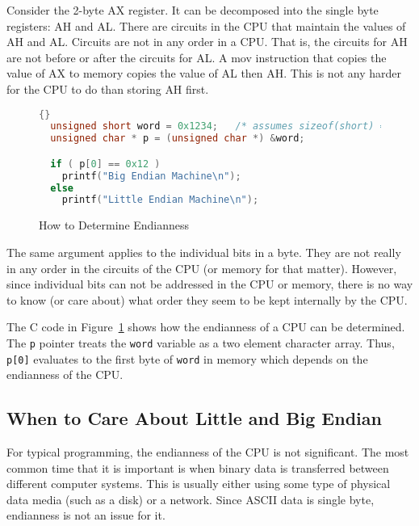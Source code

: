 Consider the 2-byte {\code AX} register. It can be decomposed into the
single byte registers: {\code AH} and {\code AL}. There are circuits
in the CPU that maintain the values of {\code AH} and {\code
AL}. Circuits are not in any order in a CPU. That is, the circuits for
{\code AH} are not before or after the circuits for {\code AL}. A
{\code mov} instruction that copies the value of {\code AX} to memory
copies the value of {\code AL} then {\code AH}. This is not any harder
for the CPU to do than storing {\code AH} first.

\begin{figure}[t]
\begin{lstlisting}[stepnumber=0,frame=tblr, language=C]{}
  unsigned short word = 0x1234;   /* assumes sizeof(short) == 2 */
  unsigned char * p = (unsigned char *) &word;

  if ( p[0] == 0x12 )
    printf("Big Endian Machine\n");
  else
    printf("Little Endian Machine\n");
\end{lstlisting}
\caption{How to Determine Endianness \label{fig:determineEndian}}
\end{figure}

The same argument applies to the individual bits in a byte. They are
not really in any order in the circuits of the CPU (or memory for that
matter). However, since individual bits can not be addressed in the
CPU or memory, there is no way to know (or care about) what order they
seem to be kept internally by the CPU.

The C code in Figure~\ref{fig:determineEndian} shows how the
endianness of a CPU can be determined.  The \lstinline|p| pointer
treats the \lstinline|word| variable as a two element character
array. Thus, \lstinline|p[0]| evaluates to the first byte of
\lstinline|word| in memory which depends on the endianness of the CPU.

\subsection{When to Care About Little and Big Endian}

For typical programming, the endianness of the CPU is not
significant. The most common time that it is important is when binary
data is transferred between different computer systems. This is
usually either using some type of physical data media (such as a disk)
or a network.  Since ASCII data
is single byte, endianness is not an issue for it.

